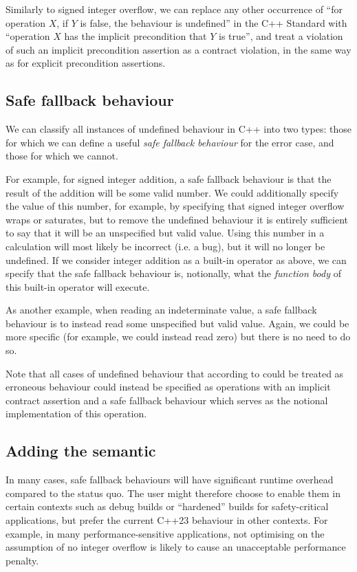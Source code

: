 Similarly to signed integer overflow, we can replace any other occurrence of ``for operation $X$, if $Y$ is false, the behaviour is undefined'' in the C++ Standard with ``operation $X$ has the implicit precondition that $Y$ is true'', and treat a violation of such an implicit precondition assertion as a contract violation, in the same way as for explicit precondition assertions.

\subsection{Safe fallback behaviour}

We can classify all instances of undefined behaviour in C++ into two types: those for which we can define a useful \emph{safe fallback behaviour} for the error case, and those for which we cannot.

For example, for signed integer addition, a safe fallback behaviour is that the result of the  addition  will be some valid number. We could additionally specify the value of this number, for example, by specifying that signed integer overflow wraps or saturates, but to remove the undefined behaviour it is entirely sufficient to say that it will be an unspecified but valid value. Using this number in a calculation will most likely be incorrect (i.e. a bug), but it will no longer be undefined. If we consider integer addition as a built-in operator as above, we can specify that the safe fallback behaviour is, notionally, what the \emph{function body} of this built-in operator will execute.

As another example, when reading an indeterminate value, a safe fallback behaviour is to instead read some unspecified but valid value. Again, we could be more specific (for example, we could instead read zero) but there is no need to do so.

Note that all cases of undefined behaviour that according to \cite{P2795R5} could be treated as erroneous behaviour could instead be specified as operations with an implicit contract assertion and a safe fallback behaviour which serves as the notional implementation of this operation.

\subsection{Adding the  semantic}

In many cases, safe fallback behaviours will have significant runtime overhead compared to the status quo. The user might therefore choose to enable them in certain contexts such as debug builds or ``hardened'' builds for safety-critical applications, but prefer the current C++23 behaviour in other contexts. For example, in many performance-sensitive applications, not optimising on the assumption of no integer overflow is likely to cause an unacceptable performance penalty. 

